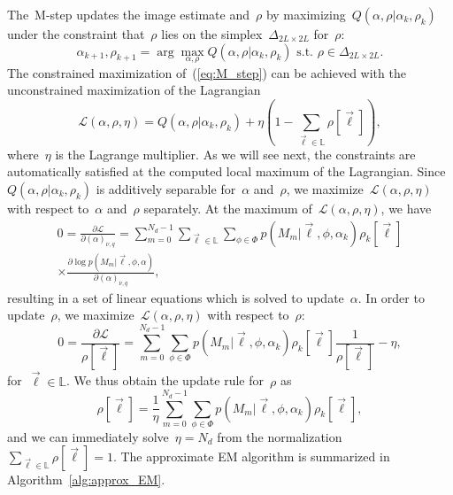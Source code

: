 \documentclass{article}
\begin{document}
The~\mbox{M-step} updates the image estimate and~$\rho$ by maximizing~$Q(\alpha, \rho|\alpha_k, \rho_k)$ under the constraint that~$\rho$ lies on the simplex~$\Delta_{2L \times 2L}$ for~$\rho$:
\begin{equation}
\label{eq:M_step}
\alpha_{k+1}, \rho_{k+1} = \arg \max_{\alpha, \rho} Q(\alpha, \rho|\alpha_k, \rho_k) \text{ s.t. } \rho \in \Delta_{2L \times 2L}.
\end{equation}
The constrained maximization of~(\ref{eq:M_step}) can be achieved with the unconstrained maximization of the Lagrangian
\begin{equation}
\mathcal{L}(\alpha, \rho, \eta) = Q(\alpha, \rho|\alpha_k, \rho_k) + \eta \left(1 - \sum_{\vec{\ell} \in \mathbb{L}} \rho[\vec{\ell}] \right),
\end{equation}
where~$\eta$ is the Lagrange multiplier. As we will see next, the constraints are automatically satisfied at the computed local maximum of the Lagrangian. Since~$Q(\alpha, \rho|\alpha_k, \rho_k)$ is additively separable for~$\alpha$ and~$\rho$, we maximize~$\mathcal{L}(\alpha, \rho, \eta)$ with respect to~$\alpha$ and~$\rho$ separately. At the maximum of~$\mathcal{L}(\alpha, \rho, \eta)$, we have
\begin{multline}
\label{eq:update_alpha}
0 = \frac{\partial \mathcal{L}}{\partial{(\alpha)_{\nu, q}}} =  \sum_{m = 0}^{N_d - 1} \sum_{\vec{\ell} \in \mathbb{L}} \sum_{\phi \in \Phi} p(M_m|\vec{\ell}, \phi, \alpha_k) \rho_k[\vec{\ell}] \\ \times \frac{\partial \log p(M_m|\vec{\ell}, \phi, \alpha)}{\partial{(\alpha)_{\nu, q}}},
\end{multline}
resulting in a set of linear equations which is solved to update~$\alpha$. In order to update~$\rho$, we maximize~$\mathcal{L}(\alpha, \rho, \eta)$ with
respect to~$\rho$:
\begin{equation}
0 = \frac{\partial \mathcal{L}}{\mathcal \rho[\vec{\ell}]} = \sum_{m = 0}^{N_d - 1} \sum_{\phi \in \Phi} p(M_m|\vec{\ell}, \phi, \alpha_k) \rho_k[\vec{\ell}] \frac{1}{\rho[\vec{\ell}]} - \eta,
\end{equation}
for~$\vec{\ell} \in \mathbb{L}$. We thus obtain the update rule for~$\rho$ as
\begin{equation}
\label{eq:update_rho}
\rho[\vec{\ell}] = \frac{1}{\eta} \sum_{m = 0}^{N_d - 1} \sum_{\phi \in \Phi} p(M_m|\vec{\ell}, \phi, \alpha_k) \rho_k[\vec{\ell}],
\end{equation}
and we can immediately solve~$\eta = N_d$ from the normalization~\mbox{$\sum_{\vec{\ell} \in \mathbb{L}} \rho[\vec{\ell}] = 1$}. The approximate EM algorithm is summarized in Algorithm~\ref{alg:approx_EM}.
\end{document}
